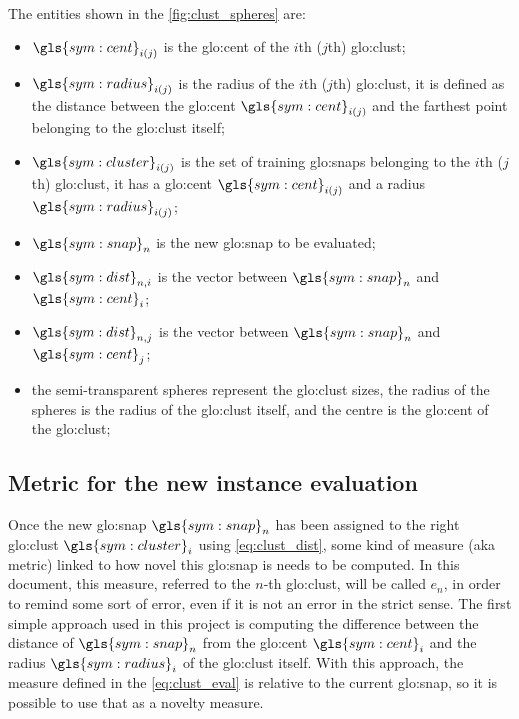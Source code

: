 \paragraph*{}
The entities shown in the \autoref{fig:clust_spheres} are:
\begin{itemize}
  \item $\gls{sym:cent}_{i(j)}$ is the \gls{glo:cent} of the $i$th ($j$th) \gls{glo:clust};
  \item $\gls{sym:radius}_{i(j)}$ is the radius of the $i$th ($j$th) \gls{glo:clust}, it is defined as the distance between the \gls{glo:cent} $\gls{sym:cent}_{i(j)}$ and the farthest point belonging to the \gls{glo:clust} itself;
  \item $\gls{sym:cluster}_{i(j)}$ is the set of training \gls{glo:snap}s belonging to the $i$th ($j$th) \gls{glo:clust}, it has a \gls{glo:cent} $\gls{sym:cent}_{i(j)}$ and a radius $\gls{sym:radius}_{i(j)}$;
  \item $\gls{sym:snap}_n$ is the new \gls{glo:snap} to be evaluated;
  \item $\gls{sym:dist}_{n,i}$ is the vector between $\gls{sym:snap}_n$ and $\gls{sym:cent}_i$;
  \item $\gls{sym:dist}_{n,j}$ is the vector between $\gls{sym:snap}_n$ and $\gls{sym:cent}_j$;
  \item the semi-transparent spheres represent the \gls{glo:clust} sizes, the radius of the spheres is the radius of the \gls{glo:clust} itself, and the centre is the \gls{glo:cent} of the \gls{glo:clust};
\end{itemize}



\subsection{Metric for the new instance evaluation}
\label{sec:clust_metric}
Once the new {\gls{glo:snap}} $\gls{sym:snap}_n$ has been assigned to the right \gls{glo:clust} $\gls{sym:cluster}_i$ using \autoref{eq:clust_dist}, some kind of measure (\gls{aka} metric) linked to how novel this {\gls{glo:snap}} is needs to be computed. In this document, this measure, referred to the $n$-th \gls{glo:clust}, will be called $e_n$, in order to remind some sort of error, even if it is not an error in the strict sense. The first simple approach used in this project is computing the difference between the distance of $\gls{sym:snap}_n$ from the {\gls{glo:cent}} $\gls{sym:cent}_i$ and the radius $\gls{sym:radius}_i$ of the \gls{glo:clust} itself. With this approach, the measure defined in the \autoref{eq:clust_eval} is relative to the current {\gls{glo:snap}}, so it is possible to use that as a novelty measure.

